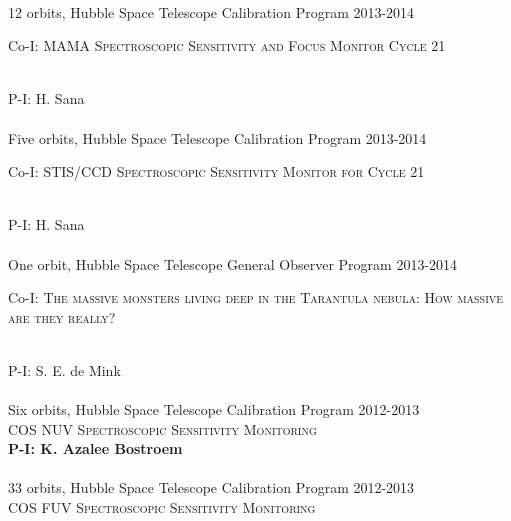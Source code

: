 \documentclass[10pt]{cv}
\begin{document}
\begin{llist}
\\
12 orbits, Hubble Space Telescope Calibration Program \hfill  2013-2014\\ %
\begin{minipage}[l]{0.7\textwidth}\vspace{0.15cm}
Co-I: \textsc{MAMA Spectroscopic Sensitivity and Focus Monitor Cycle 21}
\end{minipage}\vspace{0.15cm}\\ 
P-I: H. Sana \\ %
\\
Five orbits, Hubble Space Telescope Calibration Program \hfill  2013-2014\\ %
\begin{minipage}[l]{0.7\textwidth}\vspace{0.15cm}
Co-I: \textsc{STIS/CCD Spectroscopic Sensitivity Monitor for Cycle 21} 
\end{minipage}\vspace{0.15cm}\\
P-I: H. Sana\\ %
\\
One orbit, Hubble Space Telescope General Observer Program \hfill  2013-2014\\ %
\begin{minipage}[l]{0.7\textwidth}\vspace{0.15cm}
Co-I: \textsc{The massive monsters living deep in the Tarantula nebula: How massive are they really?} 
\end{minipage}\vspace{0.15cm}\\
P-I: S. E. de Mink\\ %
\\
Six orbits, Hubble Space Telescope Calibration Program \hfill 2012-2013\\ %
\textsc{COS NUV Spectroscopic Sensitivity Monitoring}\\
{\bf P-I: K. Azalee Bostroem} \\ %
\\
33 orbits, Hubble Space Telescope Calibration Program \hfill 2012-2013\\ %
\textsc{COS FUV Spectroscopic Sensitivity Monitoring}\\

\end{llist}
\end{document}
